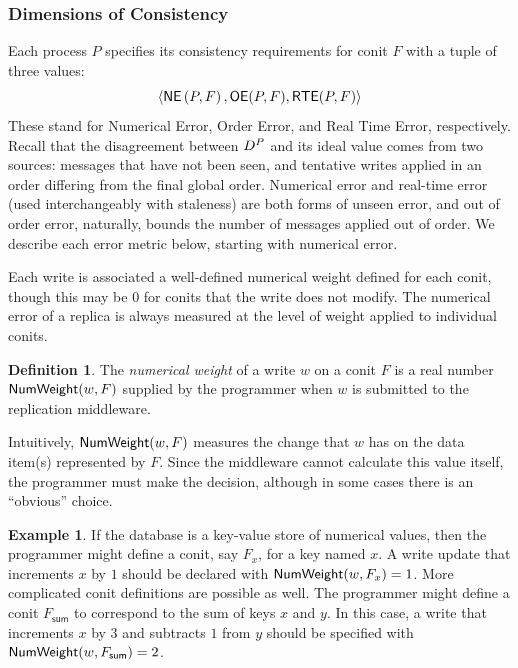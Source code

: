 \documentclass[]             %
{NASA}                       %
\theoremstyle{definition}
\newtheorem{example}[theorem]{Example}
\newtheorem{definition}[theorem]{Definition}
\begin{document}
\subsubsection{Dimensions of Consistency}
\label{ssec:conit-bounding-divergence}
Each process $P$ specifies its consistency requirements for conit $F$
with a tuple of three values:
\begin{equation*}
  \langle \mathsf{NE} \left(P, F\right), \mathsf{OE}(P, F), \mathsf{RTE}(P, F)\rangle
\end{equation*}
These stand for Numerical Error, Order Error, and Real Time Error,
respectively. Recall that the disagreement between $D^{P}$ and
its ideal value comes from two sources: messages that have not been
seen, and tentative writes applied in an order differing from the final
global order. Numerical error and real-time error (used interchangeably
with staleness) are both forms of unseen error, and out of order
error, naturally, bounds the number of messages applied out of
order. We describe each error metric below, starting with numerical error.

Each write is associated a well-defined numerical weight defined for
each conit, though this may be $0$ for conits that the write does not
modify. The numerical error of a replica is always measured at the
level of weight applied to individual conits.

\begin{definition}
  The \emph{numerical weight} of a write $w$ on a conit $F$ is a real
  number $\mathsf{NumWeight}(w, F)$ supplied by the programmer when $w$ is
  submitted to the replication middleware.
\end{definition}
\noindent Intuitively, $\mathsf{NumWeight}(w, F)$ measures the change that $w$ has on
the data item(s) represented by $F$. Since the middleware cannot
calculate this value itself, the programmer must make the decision,
although in some cases there is an ``obvious'' choice.

\begin{example}
  If the database is a key-value store of numerical values, then the
  programmer might define a conit, say $F_x$, for a key named $x$. A
  write update that increments $x$ by $1$ should be declared with
  $\mathsf{NumWeight}(w, F_x) = 1$. More complicated conit definitions are
  possible as well. The programmer might define a conit
  $F_{\mathsf{sum}}$ to correspond to the sum of keys $x$ and $y$. In
  this case, a write that increments $x$ by 3 and subtracts $1$ from
  $y$ should be specified with $\mathsf{NumWeight}(w, F_{\mathsf{sum}}) = 2$.
\end{example}
\end{document}
